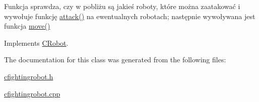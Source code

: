 Funkcja sprawdza, czy w pobliżu są jakieś roboty, które można zaatakować i wywołuje funkcję \mbox{\hyperlink{class_c_fighting_robot_a6a97cdc69ce705f810d657a31a3afbbd}{attack()}} na ewentualnych robotach; następnie wywoływana jest funkcja \mbox{\hyperlink{class_c_fighting_robot_af644acbba178e256566e9dbd230aa4db}{move()}} 



Implements \mbox{\hyperlink{class_c_robot_a8ad8d55a840ced20f85a2a045e9e24ef}{C\+Robot}}.



The documentation for this class was generated from the following files\+:\begin{DoxyCompactItemize}
\item 
\mbox{\hyperlink{cfightingrobot_8h}{cfightingrobot.\+h}}\item 
\mbox{\hyperlink{cfightingrobot_8cpp}{cfightingrobot.\+cpp}}\end{DoxyCompactItemize}

